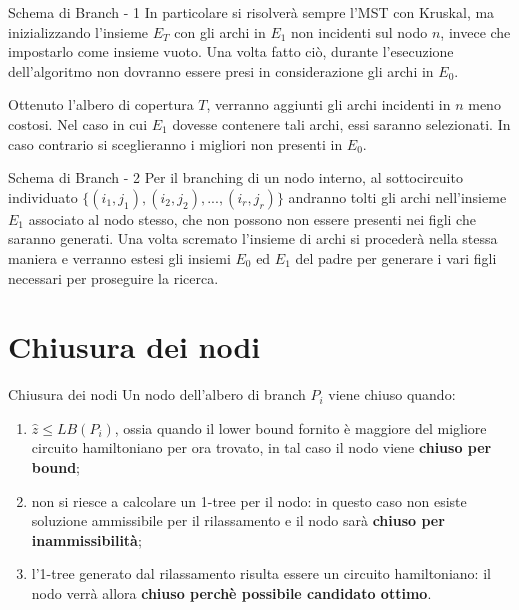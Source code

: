 \documentclass[10pt]{beamer}
\begin{document}
\begin{frame}{Schema di Branch - 1}
    In particolare si risolverà sempre l'MST con Kruskal, ma inizializzando l'insieme $E_T$ con gli archi in $E_1$ non incidenti sul nodo $n$, invece che impostarlo come insieme vuoto.\newline
    Una volta fatto ciò, durante l'esecuzione dell'algoritmo non dovranno essere presi in considerazione gli archi in $E_0$.
    
    Ottenuto l'albero di copertura $T$, verranno aggiunti gli  archi incidenti in $n$ meno costosi.\newline
    Nel caso in cui $E_1$ dovesse contenere tali archi, essi saranno selezionati. In caso contrario si sceglieranno i migliori non presenti in $E_0$. 
\end{frame}

\begin{frame}{Schema di Branch - 2}
    Per il branching di un nodo interno, al sottocircuito individuato $\{(i_1, j_1), (i_2,j_2),...,(i_r,j_r)\}$ andranno tolti gli archi nell'insieme $E_1$ associato al nodo stesso, che non possono non essere presenti nei figli che saranno generati.\newline
    Una volta scremato l'insieme di archi si procederà nella stessa maniera e verranno estesi gli insiemi $E_0$ ed $E_1$ del padre per generare i vari figli necessari per proseguire la ricerca.
\end{frame}

\section{Chiusura dei nodi}
\begin{frame}{Chiusura dei nodi}
    Un nodo dell'albero di branch $P_i$ viene chiuso quando:
    \begin{enumerate}[<+->]
        \item $\hat{z} \leq LB(P_i)$, ossia quando il lower bound fornito è maggiore del migliore circuito hamiltoniano per ora trovato, in tal caso il nodo viene \textbf{chiuso per bound};
        \item non si riesce a calcolare un 1-tree per il nodo: in questo caso non esiste soluzione ammissibile per il rilassamento e il nodo sarà \textbf{chiuso per inammissibilità};
        \item l'1-tree generato dal rilassamento risulta essere un circuito hamiltoniano: il nodo verrà allora \textbf{chiuso perchè possibile candidato ottimo}.
    \end{enumerate}
    
\end{frame}
\end{document}
